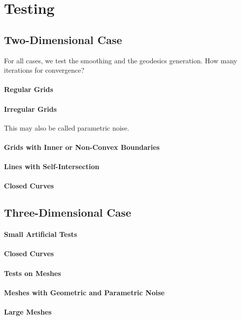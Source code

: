 \documentclass{stdlocal}
\begin{document}
\section{Testing} %
\label{sec:testing}

\subsection{Two-Dimensional Case} %
\label{sub:two_dimensional_case}
  For all cases, we test the smoothing and the geodesics generation.
  How many iterations for convergence?
  \paragraph{Regular Grids}
  \paragraph{Irregular Grids}
    This may also be called parametric noise.
  \paragraph{Grids with Inner or Non-Convex Boundaries}
  \paragraph{Lines with Self-Intersection}
  \paragraph{Closed Curves}

\subsection{Three-Dimensional Case} %
\label{sub:three_dimensional_case}
  \paragraph{Small Artificial Tests}
  \paragraph{Closed Curves}
  \paragraph{Tests on Meshes}
  \paragraph{Meshes with Geometric and Parametric Noise}
  \paragraph{Large Meshes}

\end{document}
